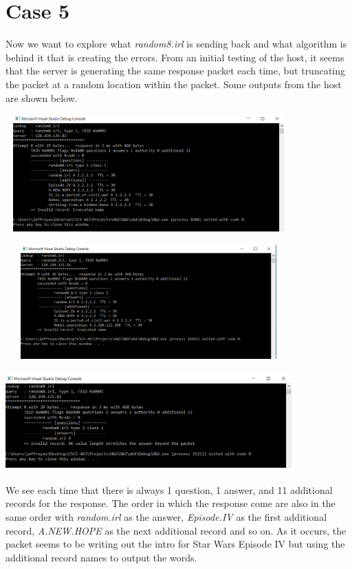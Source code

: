 \documentclass[12pt]{article}
\begin{document}
\section{Case 5}

Now we want to explore what \emph{random8.irl} is sending back and what algorithm is behind it that is creating the errors. From an initial testing of the host, it seems that the server is generating the same response packet each time, but truncating the packet at a random location within the packet. Some outputs from the host are shown below.

\begin{center}
\includegraphics[width=11cm, height=4.5cm]{random8.irlCase1}
\end{center}
\begin{center}
\includegraphics[width=11cm, height=4.4cm]{random8.irlCase2}
\end{center}
\begin{center}
\includegraphics[width=11cm, height=3.8cm]{random8.irlCase3}
\end{center}

We see each time that there is always 1 question, 1 answer, and 11 additional records for the response. The order in which the response come are also in the same order with \emph{random.irl} as the answer, \emph{Episode.IV} as the first additional record, \emph{A.NEW.HOPE} as the next additional record and so on. As it occurs, the packet seems to be writing out the intro for Star Wars Episode IV but using the additional record names to output the words. 
\end{document}
